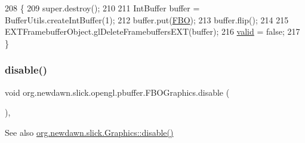 \begin{DoxyCode}
208                           \{
209         super.destroy();
210 
211         IntBuffer buffer = BufferUtils.createIntBuffer(1);
212         buffer.put(\mbox{\hyperlink{classorg_1_1newdawn_1_1slick_1_1opengl_1_1pbuffer_1_1_f_b_o_graphics_a94baa0295ca9f8d804b98c49be9abc8a}{FBO}});
213         buffer.flip();
214         
215         EXTFramebufferObject.glDeleteFramebuffersEXT(buffer);
216         \mbox{\hyperlink{classorg_1_1newdawn_1_1slick_1_1opengl_1_1pbuffer_1_1_f_b_o_graphics_a75f5500bcba77517cbb586456bab19a6}{valid}} = \textcolor{keyword}{false};
217     \}
\end{DoxyCode}
\mbox{\label{classorg_1_1newdawn_1_1slick_1_1opengl_1_1pbuffer_1_1_f_b_o_graphics_a87102f973ae4d5038c3ddfe5fdd668c7}} 
\subsubsection{\texorpdfstring{disable()}{disable()}}
{\footnotesize\ttfamily void org.\+newdawn.\+slick.\+opengl.\+pbuffer.\+F\+B\+O\+Graphics.\+disable (\begin{DoxyParamCaption}{ }\end{DoxyParamCaption})\hspace{0.3cm}{\ttfamily [inline]}, {\ttfamily [protected]}}

\begin{DoxySeeAlso}{See also}
\mbox{\hyperlink{classorg_1_1newdawn_1_1slick_1_1_graphics_a7979c584c48fc28175289e0012d5c943}{org.\+newdawn.\+slick.\+Graphics\+::disable()}} 
\end{DoxySeeAlso}

